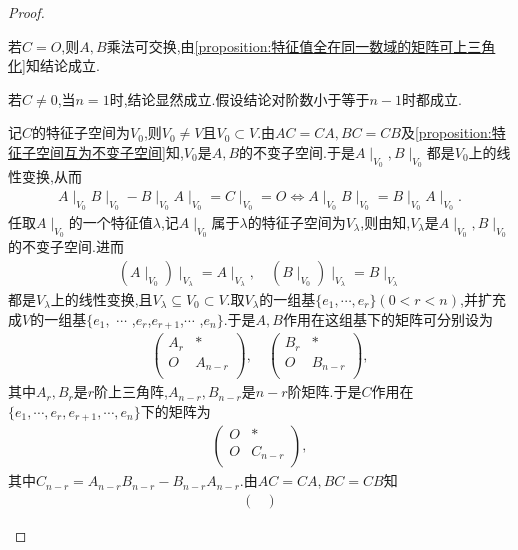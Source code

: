 \documentclass[../../main.tex]{subfiles}%
\begin{document}
\begin{proof}
\begin{enumerate}[(1)]
若$C=O$,则$A,B$乘法可交换,由\cref{proposition:特征值全在同一数域的矩阵可上三角化}知结论成立.

若$C\ne 0$,当$n=1$时,结论显然成立.假设结论对阶数小于等于$n-1$时都成立.

记$C$的特征子空间为$V_0$,则$V_0\ne V$且$V_0\subset V$.由$AC=CA,BC=CB$及\cref{proposition:特征子空间互为不变子空间}知,$V_0$是$A,B$的不变子空间.于是$A\mid_{V_0}^{},B\mid_{V_0}^{}$都是$V_0$上的线性变换,从而
\begin{align*}
A\mid_{V_0}^{}B\mid_{V_0}^{}-B\mid_{V_0}^{}A\mid_{V_0}^{}=C\mid_{V_0}^{}=O\Longleftrightarrow A\mid_{V_0}^{}B\mid_{V_0}^{}=B\mid_{V_0}^{}A\mid_{V_0}^{}.
\end{align*}
任取$A\mid_{V_0}^{}$的一个特征值$\lambda$,记$A\mid_{V_0}^{}$属于$\lambda$的特征子空间为$V_{\lambda}$,则由知,$V_{\lambda}$是$A\mid_{V_0},B\mid_{V_0}$的不变子空间.进而
\begin{align*}
\left( A\mid_{V_0}^{} \right) \mid_{V_{\lambda}}^{}=A\mid_{V_{\lambda}}^{},\quad \left( B\mid_{V_0}^{} \right) \mid_{V_{\lambda}}^{}=B\mid_{V_{\lambda}}^{}
\end{align*}
都是$V_{\lambda}$上的线性变换,且$V_{\lambda}\subseteq V_0\subset V$.取$V_{\lambda}$的一组基$\{ e_1,\cdots ,e_r \} \left( 0<r<n \right)$,并扩充成$V$的一组基$\{ e_1,$ $\cdots$ ,$e_r$,$e_{r+1}$,$\cdots$ ,$e_n \}$.于是$A,B$作用在这组基下的矩阵可分别设为
\begin{align*}
\begin{pmatrix}
A_r&		*\\
O&		A_{n-r}\\
\end{pmatrix},\quad \begin{pmatrix}
B_r&		*\\
O&		B_{n-r}\\
\end{pmatrix},
\end{align*}
其中$A_r,B_r$是$r$阶上三角阵,$A_{n-r},B_{n-r}$是$n-r$阶矩阵.于是$C$作用在$\{ e_1,\cdots ,e_r,e_{r+1},\cdots ,e_n \}$下的矩阵为
\begin{align*}
\begin{pmatrix}
O&		*\\
O&		C_{n-r}\\
\end{pmatrix},
\end{align*}
其中$C_{n-r}=A_{n-r}B_{n-r}-B_{n-r}A_{n-r}$.由$AC=CA,BC=CB$知
\begin{align*}
\begin{pmatrix}

\end{pmatrix}
\end{align*}
\end{enumerate}
\end{proof}
\end{document}
